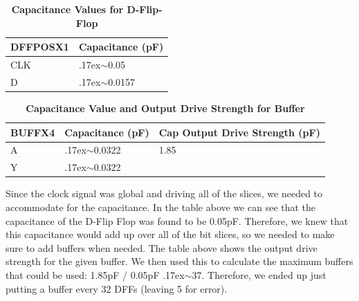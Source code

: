 \documentclass[a4paper]{article}
\newcommand{\tildep}{\raise.17ex\hbox{$\scriptstyle\sim$}}
\begin{document}

    \begin{table}[H]
        \centering
        \begin{tabular}{l | l }
            \hline
            \textbf{DFFPOSX1} &  \textbf{Capacitance (pF)} \\ \hline
            \midrule
                CLK     & \tildep 0.05 \\
                D       & \tildep 0.0157 \\
        \end{tabular}
        \caption{\textbf{Capacitance Values for D-Flip-Flop}}
    \end{table}

    \begin{table}[H]
        \centering
        \begin{tabular}{l | l | l }
            \hline
            \textbf{BUFFX4} &  \textbf{Capacitance (pF)} & \textbf{Cap Output Drive Strength (pF)}\\ \hline
            \midrule
                A     & \tildep 0.0322  & 1.85\\
                Y     & \tildep 0.0322 \\
        \end{tabular}
        \caption{\textbf{Capacitance Value and Output Drive Strength for Buffer}}
    \end{table}

    Since the clock signal was global and driving all of the slices, we needed to accommodate for the capacitance. In the
    table above we can see that the capacitance of the D-Flip Flop was found to be 0.05pF. Therefore, we knew that this
    capacitance would add up over all of the bit slices, so we needed to make sure to add buffers when needed. The table above
    shows the output drive strength for the given buffer. We then used this to calculate the maximum buffers that could be used:
    1.85pF / 0.05pF \tildep 37. Therefore, we ended up just putting a buffer every 32 DFFs (leaving 5 for error).

\end{document}
